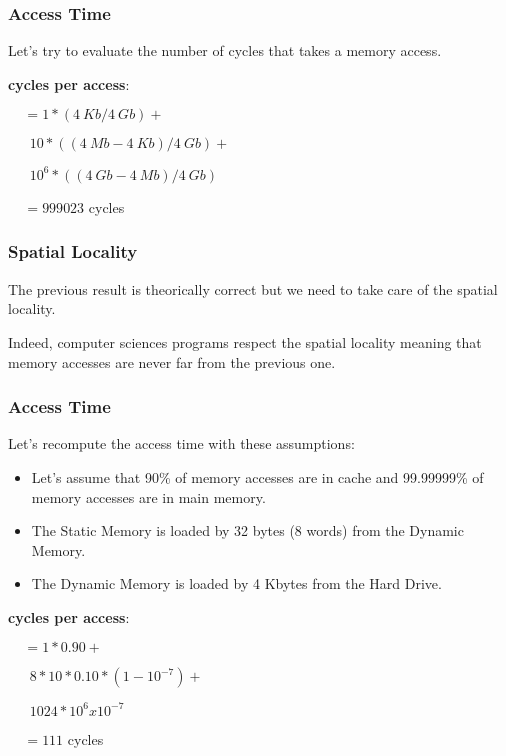 
\begin{frame}
  \frametitle{Access Time}

  Let's try to evaluate the number of cycles that takes a memory access.

  \begin{center}
  \end{center}

  \-

  \textbf{cycles per access}:

  $~~~~~= 1 * (4~Kb / 4~Gb) +$

  $~~~~~~~ 10 * ((4~Mb - 4~Kb) / 4~Gb) +$

  $~~~~~~~ 10^{6} * ((4~Gb - 4~Mb) / 4~Gb)$

  $~~~~~= 999 023$ cycles
\end{frame}


\begin{frame}
  \frametitle{Spatial Locality}

  The previous result is theorically correct but we need to take care
  of the spatial locality.

  \-

  Indeed, computer sciences programs respect the spatial locality meaning
  that memory accesses are never far from the previous one.

  \begin{center}
  \end{center}
\end{frame}


\begin{frame}
  \frametitle{Access Time}

  Let's recompute the access time with these assumptions:

  \begin{itemize}
    \item
      Let's assume that 90\% of memory accesses are in cache and
      99.99999\% of memory accesses are in main memory.
    \item
      The Static Memory is loaded by 32 bytes (8 words) from the
      Dynamic Memory.
    \item
      The Dynamic Memory is loaded by 4 Kbytes from the Hard Drive.
  \end{itemize}

  \-

  \textbf{cycles per access}:

  $~~~~~ = 1 * 0.90 +$

  $~~~~~~~ 8 * 10 * 0.10 * (1 - 10^{-7}) +$

  $~~~~~~~ 1024 * 10^{6} x 10^{-7}$

  $~~~~~ = 111$ cycles
\end{frame}

